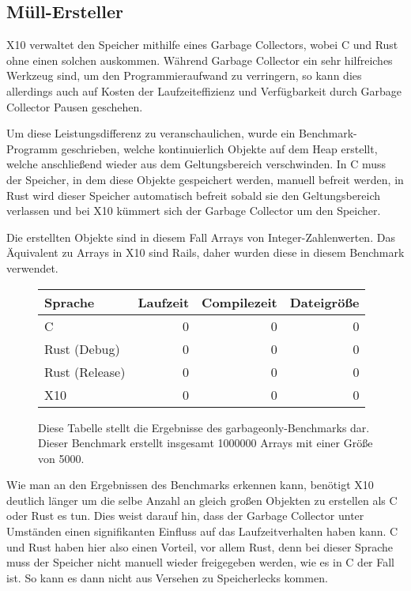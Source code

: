 \subsection{Müll-Ersteller}

X10 verwaltet den Speicher mithilfe eines Garbage Collectors, wobei C und Rust ohne einen solchen auskommen.
Während Garbage Collector ein sehr hilfreiches Werkzeug sind, um den Programmieraufwand zu verringern, so kann dies
allerdings auch auf Kosten der Laufzeiteffizienz und Verfügbarkeit durch Garbage Collector Pausen geschehen.

Um diese Leistungsdifferenz zu veranschaulichen, wurde ein Benchmark-Programm geschrieben, welche kontinuierlich
Objekte auf dem Heap erstellt, welche anschließend wieder aus dem Geltungsbereich verschwinden. In C muss der
Speicher, in dem diese Objekte gespeichert werden, manuell befreit werden, in Rust wird dieser Speicher automatisch befreit
sobald sie den Geltungsbereich verlassen und bei X10 kümmert sich der Garbage Collector um den Speicher.

Die erstellten Objekte sind in diesem Fall Arrays von Integer-Zahlenwerten. Das Äquivalent zu Arrays in X10 sind Rails,
daher wurden diese in diesem Benchmark verwendet.

\begin{figure}[hb]
	\begin{center}
		\begin{tabular}{lrrr}
			\toprule
			Sprache & Laufzeit & Compilezeit & Dateigröße \\
			\midrule
			C & 0 & 0 & 0 \\
			Rust (Debug) & 0 & 0 & 0 \\
			Rust (Release) & 0 & 0 & 0 \\
			X10 & 0 & 0 & 0 \\
			\bottomrule
		\end{tabular}
	\end{center}
	\caption{
		Diese Tabelle stellt die Ergebnisse des garbageonly-Benchmarks dar. Dieser Benchmark erstellt insgesamt 1000000
		Arrays mit einer Größe von 5000.
	}
	\label{fig:garbageonly_table}
\end{figure}

Wie man an den Ergebnissen des Benchmarks erkennen kann, benötigt X10 deutlich länger um die selbe Anzahl an gleich großen
Objekten zu erstellen als C oder Rust es tun. Dies weist darauf hin, dass der Garbage Collector unter Umständen einen signifikanten
Einfluss auf das Laufzeitverhalten haben kann. C und Rust haben hier also einen Vorteil, vor allem Rust, denn
bei dieser Sprache muss der Speicher nicht manuell wieder freigegeben werden, wie es in C der Fall ist. So kann
es dann nicht aus Versehen zu Speicherlecks kommen.

